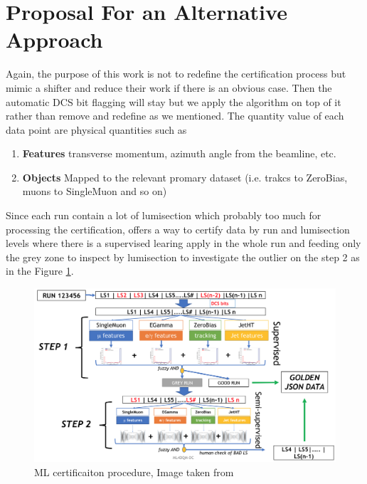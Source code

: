 \section{Proposal For an Alternative Approach}
Again, the purpose of this work is not to redefine the certification process but mimic a shifter and reduce their work if there is an obvious case.
Then the automatic DCS bit flagging will stay but we apply the algorithm on top of it rather than remove and redefine as we mentioned.
The quantity value of each data point are physical quantities such as
\begin{enumerate}
    \item \textbf{Features} transverse momentum, azimuth angle from the beamline, etc.
    \item \textbf{Objects} Mapped to the relevant promary dataset (i.e. trakcs to ZeroBias, muons to SingleMuon and so on)
\end{enumerate}
Since each run contain a lot of lumisection which probably too much for processing the certification, \cite{fiori_ml_dc_florence} offers a way to certify data by run and lumisection levels where there is a supervised learing apply in the whole run and feeding only the grey zone to inspect by lumisection to investigate the outlier on the step 2 as in the Figure \ref{fig:cartoon}.
\begin{figure}[h!]
    \centering
    \includegraphics[width=\textwidth]{images/cartoon.png}
    \caption{ML certificaiton procedure, Image taken from \cite{fiori_ml_dc_florence}}
    \label{fig:cartoon}
\end{figure}